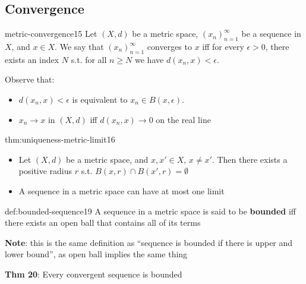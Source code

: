 \documentclass[landscape, 8pt]{extarticle}
\begin{document}
\begin{multicols}{3}
\section{Convergence}


\begin{dfn}{metric-convergence}{15}
    Let $(X,d)$ be a metric space, $(x_{n})^{\infty}_{n=1}$ be a sequence in $X$, and $x\in X$. We say that $(x_{n})^{\infty}_{n=1}$ converges to $x$ iff for every $\epsilon > 0$, there exists an index $N$ s.t. for all $n\ge N$ we have $d(x_{n}, x) < \epsilon$.

    Observe that:
    \vspace{-5pt}
    \begin{itemize}
        \item $d(x_{n}, x)< \epsilon$ is equivalent to $x_{n}\in B(x,\epsilon)$.
        \item $x_{n}\to x$ in $(X,d)$ iff $d(x_{n}, x)\to 0$ on the real line
    \end{itemize}
\end{dfn}

\begin{thm}{thm:uniqueness-metric-limit}{16}
    \begin{itemize}
        \item Let $(X,d)$ be a metric space, and $x,x'\in X,\,x\ne x'$. Then there exists a positive radius $r$ s.t. $B(x,r)\cap B(x',r) = \emptyset$
        \item A sequence in a metric space can have at most one limit
    \end{itemize}
\end{thm}

\begin{dfn}{def:bounded-sequence}{19}
    A sequence in a metric space is said to be \textbf{bounded} iff there exists an open ball that contains all of its terms

    \longrule{0.08ex}
    \textbf{Note}: this is the same definition as ``sequence is bounded if there is upper and lower bound'', as open ball implies the same thing

    \longrule{0.08ex}
    \textbf{Thm 20}: Every convergent sequence is bounded
\end{dfn}


\end{multicols}
\end{document}
